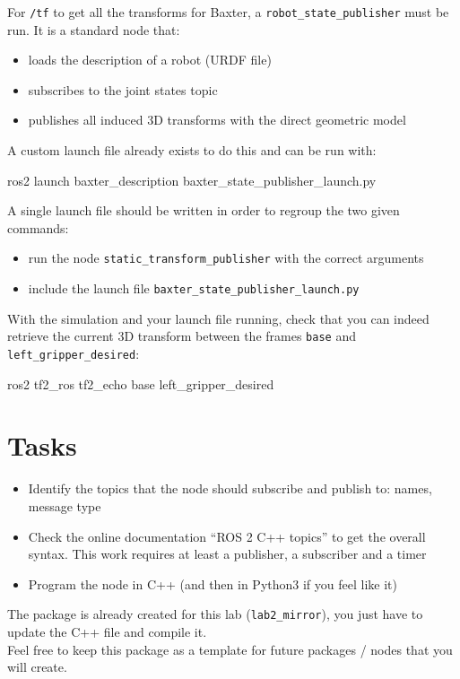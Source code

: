 \documentclass{ecnreport}
\begin{document}
For \texttt{/tf} to get all the transforms for Baxter, a \texttt{robot\_state\_publisher} must be run. It is a standard node that:
\begin{itemize}
 \item loads the description of a robot (URDF file)
 \item subscribes to the joint states topic
 \item publishes all induced 3D transforms with the direct geometric model
\end{itemize}
A custom launch file already exists to do this and can be run with:
\begin{bashcodelarge}
 ros2 launch baxter_description baxter_state_publisher_launch.py
\end{bashcodelarge}


A single launch file should be written in order to regroup the two given commands:
\begin{itemize}
 \item run the node \texttt{static\_transform\_publisher} with the correct arguments
 \item include the launch file \texttt{baxter\_state\_publisher\_launch.py}
 \end{itemize}
 
 With the simulation and your launch file running, check that you can indeed retrieve the current 3D transform between the frames \texttt{base} and \texttt{left\_gripper\_desired}:
 \begin{bashcodelarge}
 ros2 tf2_ros tf2_echo base left_gripper_desired
\end{bashcodelarge}



\section{Tasks}

\begin{itemize}
\item Identify the topics that the node should subscribe and publish to: names, message type
\item Check the online documentation ``ROS 2 C++ topics'' to get the overall syntax. This work requires at least a publisher, a subscriber and a timer
\item Program the node in C++ (and then in Python3 if you feel like it)
\end{itemize}

The package is already created for this lab (\texttt{lab2\_mirror}), you just have to update the C++ file and compile it.\\
Feel free to keep this package as a template for future packages / nodes that you will create.
\end{document}
